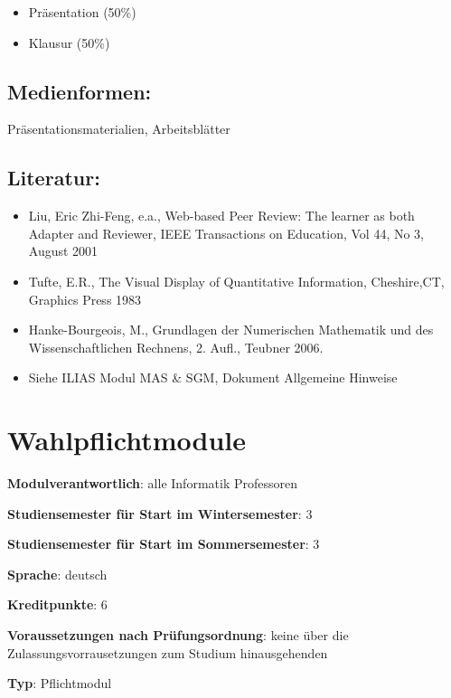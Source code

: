 \begin{itemize}
\tightlist
\item
  Präsentation (50\%)
\item
  Klausur (50\%)
\end{itemize}

\section*{Medienformen:}\label{medienformen-2}

Präsentationsmaterialien, Arbeitsblätter

\section*{Literatur:}\label{literatur-2}

\begin{itemize}
\tightlist
\item
  Liu, Eric Zhi-Feng, e.a., Web-based Peer Review: The learner as both
  Adapter and Reviewer, IEEE Transactions on Education, Vol 44, No 3,
  August 2001
\item
  Tufte, E.R., The Visual Display of Quantitative Information,
  Cheshire,CT, Graphics Press 1983
\item
  Hanke-Bourgeois, M., Grundlagen der Numerischen Mathematik und des
  Wissenschaftlichen Rechnens, 2. Aufl., Teubner 2006.
\item
  Siehe ILIAS Modul MAS \& SGM, Dokument Allgemeine Hinweise
\end{itemize}

\chapter{Wahlpflichtmodule}\label{wahlpflichtmodule}

\begin{modulHead}
\textbf{Modulverantwortlich}: alle Informatik
Professoren
\end{modulHead}
\begin{modulHead}
\textbf{Studiensemester
für Start im Wintersemester}:
3
\end{modulHead}
\begin{modulHead}
\textbf{Studiensemester für Start
im Sommersemester}:
3
\end{modulHead}
\begin{modulHead}
\textbf{Sprache}:
deutsch
\end{modulHead}
\begin{modulHead}
\textbf{Kreditpunkte}:
6
\end{modulHead}
\begin{modulHead}
\textbf{Voraussetzungen nach
Prüfungsordnung}: keine über die Zulassungsvorrausetzungen zum Studium
hinausgehenden
\end{modulHead}
\begin{modulHead}
\textbf{Typ}:
Pflichtmodul
\end{modulHead}


